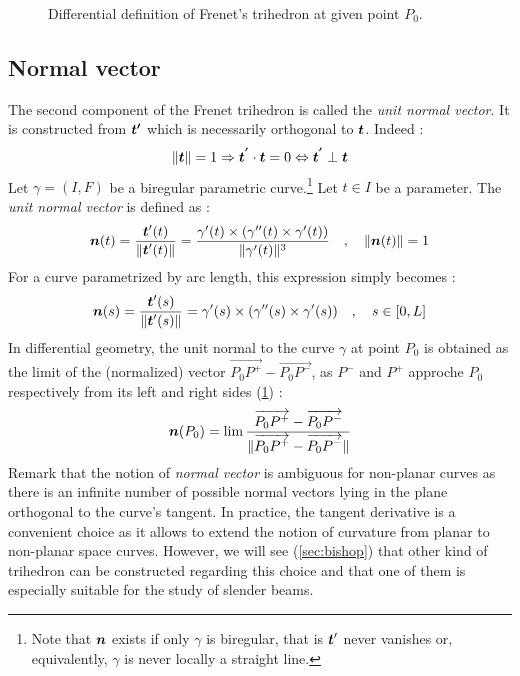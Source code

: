 \begin{figure}[t]
     \centering
     \caption{Differential definition of Frenet's trihedron at given point $P_0$.}
     \label{fig:3_1}
\end{figure}

\subsection{Normal vector}
The second component of the Frenet trihedron is called the \emph{unit normal vector}. It is constructed from $\boldsymbol{t'}$ which is necessarily orthogonal to $\boldsymbol{t}$. Indeed :
\begin{equation}
	\lVert\boldsymbol{t}\rVert=1 \Rightarrow \boldsymbol{t^{'}} \cdot  \boldsymbol{t} = 0 \Leftrightarrow  \boldsymbol{t^{'}} \perp \boldsymbol{t}
\end{equation}
Let $\gamma = (I,F)$ be a biregular parametric curve.\footnote{Note that $\boldsymbol{n}$ exists if only $\gamma$ is biregular, that is $\boldsymbol{t}'$ never vanishes or, equivalently, $\gamma$ is never locally a straight line.} Let $t \in I$ be a parameter. The \emph{unit normal vector} is defined as :
\begin{equation}
	\boldsymbol{n}(t) = \frac{\boldsymbol{t}'(t)}{\lVert\boldsymbol{t}'(t)\rVert} 
	= \frac{\gamma'(t) \times (\gamma''(t) \times \gamma'(t))}{\lVert\gamma'(t)\rVert^3}
	\quad,\quad
	\lVert\boldsymbol{n}(t)\rVert=1
\end{equation}
For a curve parametrized by arc length, this expression simply becomes :
\begin{equation}
	\boldsymbol{n}(s) = \frac{\boldsymbol{t}'(s)}{\lVert\boldsymbol{t}'(s)\rVert} 
	= \gamma'(s) \times (\gamma''(s) \times \gamma'(s))
	\quad,\quad
	s \in [0,L]
\end{equation}
In differential geometry, the unit normal to the curve $\gamma$ at point $P_0$ is obtained as the limit of the (normalized) vector $\overrightarrow{P_0 P^+}-\overrightarrow{P_0 P^-}$, as $P^-$ and $P^+$ approche $P_0$ respectively from its left and right sides (\cref{fig:3_1}) :
\begin{equation}
	\boldsymbol{n}(P_0)
	= \lim_{}\frac{\overrightarrow{P_0 P^+}-\overrightarrow{P_0 P^-}}{\lVert\overrightarrow{P_0 P^+}-\overrightarrow{P_0 P^-}\rVert}
\label{eq:3_4}
\end{equation}
Remark that the notion of \emph{normal vector} is ambiguous for non-planar curves as there is an infinite number of possible normal vectors lying in the plane orthogonal to the curve's tangent. In practice, the tangent derivative is a convenient choice as it allows to extend the notion of curvature from planar to non-planar space curves. However, we will see (\cref{sec:bishop}) that other kind of trihedron can be constructed regarding this choice and that one of them is especially suitable for the study of slender beams.

